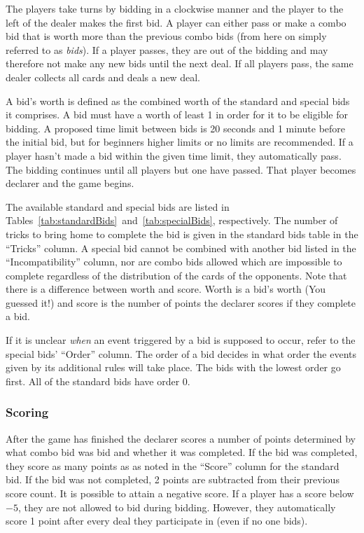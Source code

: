 \documentclass[a4paper]{article}
\begin{document}
				The players take turns by bidding in a clockwise manner and the player to the left of the dealer makes the first bid. A player can either pass or make a combo bid that is worth more than the previous combo bids (from here on simply referred to as \emph{bids}). If a player passes, they are out of the bidding and may therefore not make any new bids until the next deal. If all players pass, the same dealer collects all cards and deals a new deal.

				A bid's worth is defined as the combined worth of the standard and special bids it comprises. A bid must have a worth of least 1 in order for it to be eligible for bidding. A proposed time limit between bids is 20 seconds and 1 minute before the initial bid, but for beginners higher limits or no limits are recommended. If a player hasn't made a bid within the given time limit, they automatically pass. The bidding continues until all players but one have passed. That player becomes declarer and the game begins.

				The available standard and special bids are listed in Tables~\ref{tab:standardBids}~and~\ref{tab:specialBids}, respectively. The number of tricks to bring home to complete the bid is given in the standard bids table in the ``Tricks'' column. A special bid cannot be combined with another bid listed in the ``Incompatibility'' column, nor are combo bids allowed which are impossible to complete regardless of the distribution of the cards of the opponents. Note that there is a difference between worth and score. Worth is a bid's worth (You guessed it!) and score is the number of points the declarer scores if they complete a bid.

				If it is unclear \emph{when} an event triggered by a bid is supposed to occur, refer to the special bids' ``Order'' column. The order of a bid decides in what order the events given by its additional rules will take place. The bids with the lowest order go first. All of the standard bids have order 0.

			\subsubsection{Scoring}
				After the game has finished the declarer scores a number of points determined by what combo bid was bid and whether it was completed. If the bid was completed, they score as many points as as noted in the ``Score'' column for the standard bid. If the bid was not completed, 2 points are subtracted from their previous score count. It is possible to attain a negative score. If a player has a score below $-5$, they are not allowed to bid during bidding. However, they automatically score 1 point after every deal they participate in (even if no one bids).
\end{document}
